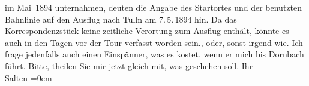 \begin{ledgroupsized}[t]{13cm}
{{{                  im Mai 1894 unternahmen, deuten die Angabe des Startortes und der benutzten
                     Bahnlinie auf den
                  Ausflug nach Tulln am 7. 5. 1894 hin. Da
                  das Korrespondenzstück keine zeitliche Verortung zum Ausflug enthält, könnte es
                  auch in den Tagen vor der Tour verfasst worden sein.}}}\label{K_L03133-2h}, oder, sonst irgend
               wie. Ich frage jedenfalls auch einen Einspänner, was es kostet, wenn er mich bis Dornbach führt.\pend
           \pstart
           Bitte, theilen Sie mir jetzt gleich mit, was geschehen soll.\pend
           \pstart
           Ihr {\\[\baselineskip]}\spacefill\mbox{Salten}\pend
           \leftskip=0em{}
         
         \endnumbering{}\end{ledgroupsized}  \newcommand{\dateiname}{L03133}\newcommand{\titel}{Felix Salten an Arthur Schnitzler, [7.? 5. 1894]}\newcommand{\editorInnen}{Martin Anton Müller und Laura Untner}
      